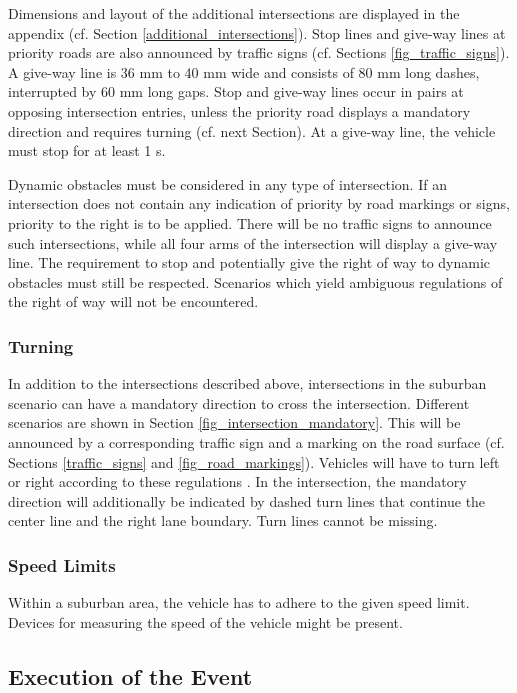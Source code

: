 Dimensions and layout of the additional intersections are displayed in the
appendix (cf. Section \ref{additional_intersections}). Stop lines and give-way
lines at priority roads are also announced by traffic signs (cf. Sections
\ref{fig_traffic_signs}). A give-way line is 36 mm to 40 mm wide and consists
of 80 mm long dashes, interrupted by 60 mm long gaps. Stop and give-way lines
occur in pairs at opposing intersection entries, unless the priority road
displays a mandatory direction and requires turning (cf. next Section). At a
give-way line, the vehicle must stop for at least 1 s.

Dynamic obstacles must be considered in any type of intersection. If an
intersection does not contain any indication of priority by road markings or
signs, priority to the right is to be applied. There will be no traffic signs
to announce such intersections, while all four arms of the intersection will
display a give-way line. The requirement to stop and potentially give the right
of way to dynamic obstacles must still be respected. Scenarios which yield
ambiguous regulations of the right of way will not be encountered.

\subsubsection{Turning}
\label{turning}

In addition to the intersections described above, intersections in the suburban
scenario can have a mandatory direction to cross the intersection. Different
scenarios are shown in Section \ref{fig_intersection_mandatory}. This will be
announced by a corresponding traffic sign and a marking on the road surface
(cf. Sections \ref{traffic_signs} and \ref{fig_road_markings}). Vehicles will
have to turn left or right according to these regulations . In the intersection, the
mandatory direction will additionally be indicated by dashed turn lines that
continue the center line and the right lane boundary. Turn lines cannot be
missing.

\subsubsection{Speed Limits}

Within a suburban area, the vehicle has to adhere to the given speed limit.
Devices for measuring the speed of the vehicle might be present.

\subsection{Execution of the Event}

